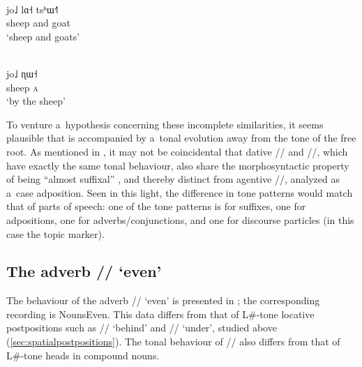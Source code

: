  \begin{exe}
 	\ex
 	\label{ex:sheepandgoats}
 	\\
 	\gll jo˩		lɑ˧		tsʰɯ˧˥\\
 	sheep		and		goat\\
 	\glt ‘sheep and goats’
 \end{exe}
 
 \begin{exe}
 	\ex
 	\label{ex:bythesheep}
 	\\
 	\gll jo˩		ɳɯ˧\\
 	sheep		\textsc{a}\\
 	\glt ‘by the sheep’
 \end{exe}

To venture a~hypothesis concerning these incomplete similarities, it seems plausible that  is accompanied by a~tonal evolution away from the tone of the free root. As mentioned in , it may not be coincidental that dative
// and  //, which have exactly the same tonal behaviour, also share the morphosyntactic property of being “almost suffixal” \citep[155]{lidz2010}, and thereby distinct from agentive //, analyzed as a~case adposition. Seen in this light, the difference in tone patterns would match that of parts of speech: one of the tone patterns is for suffixes, one for adpositions, one for adverbs/conjunctions, and one for discourse particles (in this case the topic marker). 

\subsection{The adverb // ‘even’}
\label{sec:evenplusnoun}

The behaviour of the adverb // ‘even’ is presented in ; the corresponding recording is NounsEven. This data differs from that of L\#-tone locative postpositions such as //
‘behind’ and // ‘under’, studied above (\ref{sec:spatialpostpositions}). The tonal behaviour of // also differs from that of L\#-tone heads in
compound nouns.


